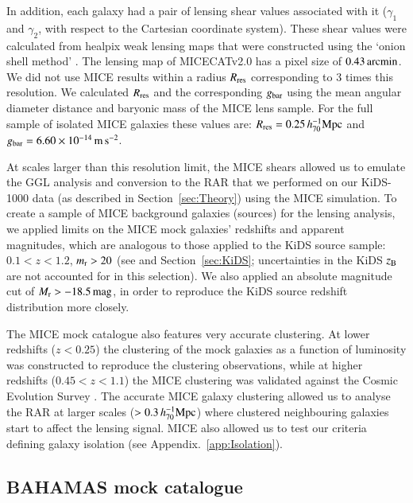 \documentclass{aa}
\newcommand{\hMpc}{\,h_{70}^{-1}{\rm{Mpc}} }
\newcommand{\mpss}{\,{\rm m}\,{\rm s}^{-2} }
\newcommand{\am}{\,{\rm arcmin}}
\newcommand*{\E}[1]{\times 10^{#1}}
\newcommand{\un}[1]{_{\rm #1}}
\begin{document}
In addition, each galaxy had a pair of lensing shear values associated with it ($\gamma_1$ and $\gamma_2$, with respect to the Cartesian coordinate system). These shear values were calculated from {\sc healpix} weak lensing maps that were constructed using the `onion shell method' \cite[]{fosalba2008, fosalba2015a}. The lensing map of MICECATv2.0 has a pixel size of $0.43 \am$. We did not use MICE results within a radius $R\un{res}$ corresponding to 3 times this resolution. We calculated $R\un{res}$ and the corresponding $g\un{bar}$ using the mean angular diameter distance and baryonic mass of the MICE lens sample. For the full sample of isolated MICE galaxies these values are: $R\un{res}=0.25 \hMpc$ and $g\un{bar}=6.60\E{-14} \mpss$.

At scales larger than this resolution limit, the MICE shears allowed us to emulate the GGL analysis and conversion to the RAR that we performed on our KiDS-1000 data (as described in Section~\ref{sec:Theory}) using the MICE simulation. To create a sample of MICE background galaxies (sources) for the lensing analysis, we applied limits on the MICE mock galaxies' redshifts and apparent magnitudes, which are analogous to those applied to the KiDS source sample: $0.1 < z < 1.2$, $m\un{r}>20$ (see \citealp{hildebrandt2017} and Section~\ref{sec:KiDS}; uncertainties in the KiDS $z\un{B}$ are not accounted for in this selection). We also applied an absolute magnitude cut of $M\un{r}>-18.5 \, {\rm mag}$, in order to reproduce the KiDS source redshift distribution more closely.

The MICE mock catalogue also features very accurate clustering. At lower redshifts ($z<0.25$) the clustering of the mock galaxies as a function of luminosity was constructed to reproduce the \cite{zehavi2011} clustering observations, while at higher redshifts ($0.45<z<1.1$) the MICE clustering was validated against the Cosmic Evolution Survey \cite[COSMOS;][]{ilbert2009}. The accurate MICE galaxy clustering allowed us to analyse the RAR at larger scales ($>0.3\hMpc$) where clustered neighbouring galaxies start to affect the lensing signal. MICE also allowed us to test our criteria defining galaxy isolation (see Appendix.~\ref{app:Isolation}).

\subsection{BAHAMAS mock catalogue}
\label{sec:Bahamas}
\end{document}
